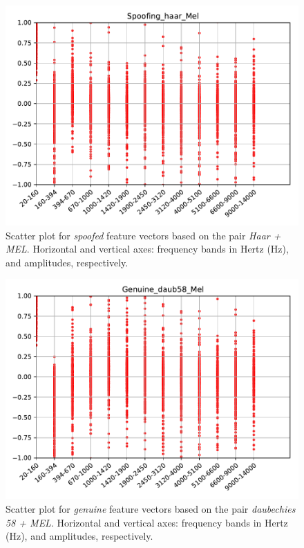 		\begin{figure}[H]
			\centering
			\includegraphics[scale=.7]{images/results/barkVersusMel/Spoofing_haar_Mel.pdf}
			\caption{Scatter plot for \textit{spoofed} feature vectors based on the pair \textit{Haar + MEL}. Horizontal and vertical axes: frequency bands in Hertz (Hz), and amplitudes, respectively.}
			\label{fig:spoofinghaarmel}
		\end{figure}
		\begin{figure}[H]
			\centering
			\includegraphics[scale=.7]{images/results/barkVersusMel/Genuine_daub58_Mel.pdf}
			\caption{Scatter plot for \textit{genuine} feature vectors  based on the pair \textit{daubechies 58 + MEL}. Horizontal and vertical axes: frequency bands in Hertz (Hz), and amplitudes, respectively.}
			\label{fig:livedaub58mel}
		\end{figure}
